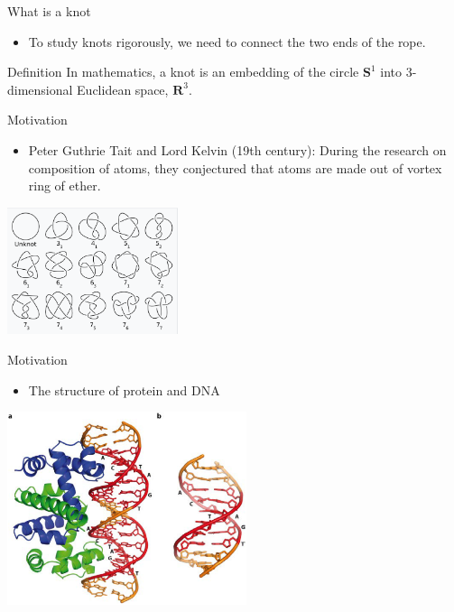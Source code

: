 \documentclass[]{beamer}
\begin{document}
\begin{frame}{What is a knot}
\begin{itemize}
    \item To study knots rigorously, we need to connect the two ends of the rope.
\end{itemize}
\begin{kulblock}{Definition}
    In mathematics, a knot is an embedding of the circle $\mathbf{S}^1$ into 3-dimensional Euclidean space, $\mathbf{R}^3$.
\end{kulblock}

\end{frame}

\begin{frame}{Motivation}
\begin{itemize}
    \item Peter Guthrie Tait and Lord Kelvin (19th century): During the research on composition of atoms, they conjectured that atoms are made out of vortex ring of ether.
\end{itemize}
\centering
\includegraphics[width=5cm]{Pictures/simple knots.png}
\end{frame}

\begin{frame}{Motivation}
\begin{itemize}
    \item The structure of protein and DNA
\end{itemize}
\centering
\includegraphics[width=7cm]{Pictures/DNA.png}
\end{frame}
\end{document}
